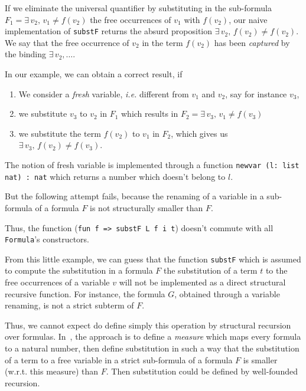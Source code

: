 If we eliminate the universal quantifier by substituting in
the sub-formula $F_1=  \exists\,v_2,\,v_1\not=f(v_2)$ the free
occurrences of $v_1$ with $f(v_2)$, our naive implementation of
\texttt{substF} returns the absurd proposition $\exists\,v_2,\,f(v_2)\not=f(v_2)$. We  say that the free occurrence of $v_2$ in the term $f(v_2)$ has been \emph{captured} by the binding $\exists\,v_2,\dots$.


In our example, we can obtain a correct result, if
\begin{enumerate}
\item We consider a \emph{fresh} variable, \emph{i.e.}  different from $v_1$ and $v_2$, say for instance $v_3$,
\item we substitute $v_3$ to $v_2$ in $F_1$ which results in
   $F_2= \exists\,v_3,\,v_1\not=f(v_3)$
\item we substitute the term $f(v_2)$ to $v_1$ in $F_2$, which gives us 
  $\exists\,v_3,\,f(v_2)\not=f(v_3)$.
\end{enumerate}

The notion of fresh variable is implemented through a function
\texttt{newvar (l: list nat) : nat} which returns a number which doesn't belong to $l$.

But the following attempt fails, because the renaming of a  variable in a 
sub-formula of a formula $F$ is not structurally smaller than $F$.




Thus, the function (\texttt{fun f => substF L f i t}) doesn't commute with all \texttt{Formula}'s constructors.


From this little example, we can guess that the function
\texttt{substF} which is assumed to compute the substitution in a formula $F$ the substitution of a term $t$ to the free occurrences of a variable $v$ will not be implemented as a direct structural recursive function. For instance, the formula $G$, obtained through a variable renaming, is not a strict subterm of $F$.

Thus, we cannot expect do define simply this operation by 
structural recursion over formulas. 
In~\cite{Goedel}, the approach is to define a \emph{measure}
which maps every formula to a natural number, then define substitution in such a way that the substitution of a term to a free variable in a strict sub-formula  of a formula $F$ is smaller
(w.r.t. this measure) than $F$. 
Then substitution could be defined by well-founded recursion.

